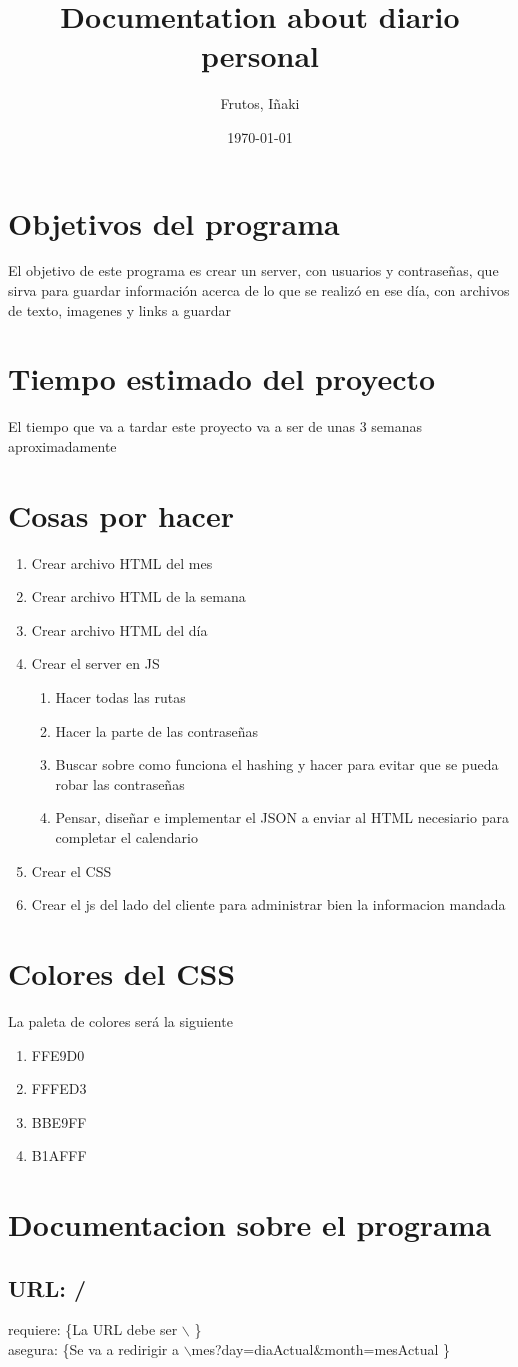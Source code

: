 \documentclass[12pt]{article}
\title{Documentation about diario personal}
\author{Frutos, I\~{n}aki}
\date{\today}
\begin{document}
\maketitle
\tableofcontents

\section{Objetivos del programa}
\begin{normalsize}
 El objetivo de este programa es crear un server, con usuarios 	y contraseñas, que sirva para guardar información acerca de lo que se realizó en ese día, con archivos de texto, imagenes y 	links a guardar
 \end{normalsize}
\section{Tiempo estimado del proyecto}
	El tiempo que va a tardar este proyecto va a ser de unas 3 			semanas aproximadamente
\section{Cosas por hacer}
	\begin{enumerate}
		\item Crear archivo HTML del mes
		\item Crear archivo HTML de la semana
		\item Crear archivo HTML del día
		\item Crear el server en JS
		\begin{enumerate}
			\item Hacer todas las rutas
			\item Hacer la parte de las contraseñas
			\item Buscar sobre como funciona el hashing y hacer para evitar que se pueda robar las contraseñas
			\item Pensar, diseñar e implementar el JSON a enviar al HTML necesiario para completar el calendario
		\end{enumerate}
		\item Crear el CSS
		\item Crear el js del lado del cliente para administrar bien la informacion mandada
	\end{enumerate} 
\section{Colores del CSS}
La paleta de colores será la siguiente
\begin{enumerate}
    \item FFE9D0
    \item FFFED3
    \item BBE9FF
    \item B1AFFF
\end{enumerate}
\section{Documentacion sobre el programa}
\subsection{URL: /}
	requiere: \{La URL debe ser $\backslash$ \} \\
	asegura: \{Se va a redirigir a $\backslash$mes?day=diaActual$\&$month=mesActual \}
	
\end{document}
